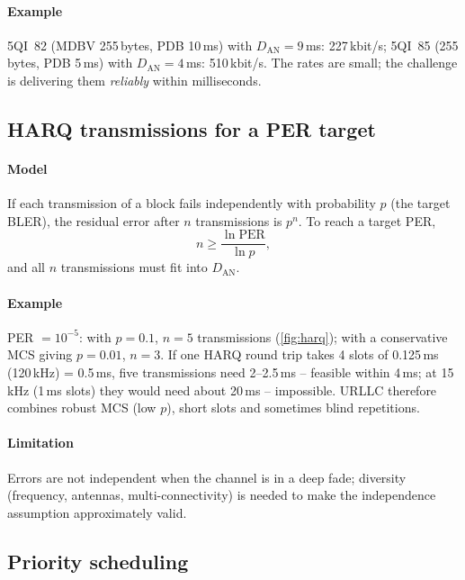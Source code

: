 \documentclass[11pt,a4paper]{article}
\begin{document}
\paragraph{Example} 5QI~82 (MDBV 255\,bytes, PDB 10\,ms) with $D_{\mathrm{AN}} = 9$\,ms: 227\,kbit/s; 5QI~85 (255\,bytes, PDB 5\,ms) with
$D_{\mathrm{AN}} = 4$\,ms: 510\,kbit/s. The rates are small; the challenge is delivering them \emph{reliably} within milliseconds.

\subsection{HARQ transmissions for a PER target}\label{sec:harq}
\paragraph{Model} If each transmission of a block fails independently with probability $p$ (the target BLER), the residual error after $n$
transmissions is $p^n$. To reach a target PER,
\begin{equation}\label{eq:harq}
  n \ge \frac{\ln \mathrm{PER}}{\ln p},
\end{equation}
and all $n$ transmissions must fit into $D_{\mathrm{AN}}$.
\paragraph{Example} PER $= 10^{-5}$: with $p = 0.1$, $n = 5$ transmissions (\cref{fig:harq}); with a conservative MCS giving $p = 0.01$, $n = 3$. If one
HARQ round trip takes 4 slots of 0.125\,ms (120\,kHz) = 0.5\,ms, five transmissions need 2--2.5\,ms -- feasible within 4\,ms; at 15\,kHz (1\,ms slots)
they would need about 20\,ms -- impossible. URLLC therefore combines robust MCS (low $p$), short slots and sometimes blind repetitions.
\paragraph{Limitation} Errors are not independent when the channel is in a deep fade; diversity (frequency, antennas, multi-connectivity) is
needed to make the independence assumption approximately valid.

\begin{acnfigure}
  \caption{Residual packet error rate after $n$ transmissions (\cref{eq:harq}).}
  \label{fig:harq}
\end{acnfigure}

\subsection{Priority scheduling}\label{sec:prio}
\end{document}
